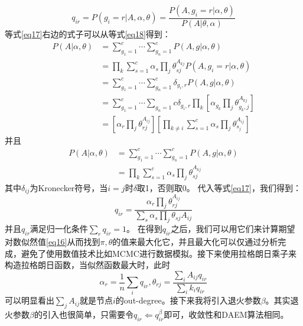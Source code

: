 \documentclass[a4paper,12pt,openany,oneside,utf-8]{ctexbook}
\begin{document}
    \begin{equation}\label{eq17}
        q_{i r}=P(g_i=r|A,\alpha,\theta)=\frac{P(A,g_i=r|\alpha,\theta)}{P(A|\theta,\alpha)}
    \end{equation}
    等式\ref{eq17}右边的式子可以从等式\ref{eq18}得到：
    \begin{equation}\label{eq18}
    \begin{aligned}
     P(A|\alpha,\theta)&=\sum_{g_1=1}^c\cdots\sum_{g_n=1}^cP(A,g|\alpha,\theta)\\&=\prod_k\sum_{s=1}^c\alpha_s\prod_j\theta_{s j}^{A_{k j}}
        P(A,g_i=r|\alpha,\theta)\\&=\sum_{g_1=1}^{c}\cdots\sum_{g_n=1}^{c}\delta _{g_i,r}P(A,g|\alpha,\theta)\\&=\sum_{g_1=1}^{c}\cdots\sum_{g_n=1}{c}\delta_{g_i,r}\prod _{k}[\alpha_{g_k}\prod_j \theta_{g_k,j}^{A_{kj}}]\\&=[\alpha_r\prod_j \theta_{rj}^{A_{i j}}][\prod_{k\neq i}\sum_{s=1}^{c}\alpha_s\prod_j\theta_{s_j}^{A_{i j}}]
    \end{aligned}
    \end{equation}
    并且
    \begin{equation}
    \begin{aligned}
        P(A|\alpha,\theta)&=\sum_{g_1=1}^c\cdots\sum_{g_n=1}^cP(A,g|\alpha,\theta)\\&=\prod_k\sum_{s=1}^c\alpha_s\prod_j\theta_{s j}^{A_{k j}}
    \end{aligned}
    \end{equation}
    其中$\delta_{i j}$为Kronecker符号，当$i=j$时$\delta$取1，否则取0。
    代入等式\ref{eq17}，我们得到：
    \begin{equation}
        q_{i r}=\frac{\alpha_r\prod_j\theta_{r j}^{A_{i j}}}{\sum_s\alpha_s\prod_j\theta_{s j}{A_{i j}}}
    \end{equation}
    并且$q_{i r}$满足归一化条件$\sum_r q_{i r}=1$。
    在得到$q_{ir}$之后，我们可以用它们来计算期望对数似然值\ref{eq16}从而找到$\pi,\theta$的值来最大化它，并且最大化可以仅通过分析完成，避免了使用数值技术比如MCMC进行数据模拟。接下来使用拉格朗日乘子来构造拉格朗日函数，当似然函数最大时，此时
    \begin{equation}
        \alpha_r=\frac{1}{n}\sum_i q_{i r}, \theta_{r j}=\frac{\sum_i A_{i j}q_{i r}}{\sum_i k_i q_{i r}}
    \end{equation}
    可以明显看出$\sum_j A_{i j}$就是节点$i$的out-degree。接下来我将引入退火参数$\beta$。其实退火参数$\beta$的引入也很简单，只需要令$q_{i r}\Leftarrow q_{i r}^\beta$即可，收敛性和DAEM算法相同。
    
\end{document}
